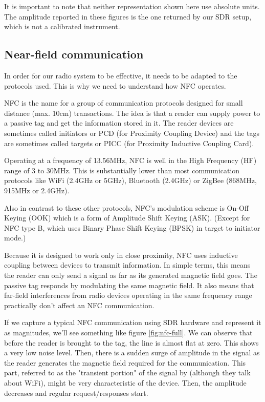 It is important to note that neither representation shown here use absolute units. The amplitude reported in these figures is the one returned by our SDR setup, which is not a calibrated instrument.

\subsection{Near-field communication} \label{nfc}

In order for our radio system to be effective, it needs to be adapted to the protocols used. This is why we need to understand how NFC operates.

NFC is the name for a group of communication protocols designed for small distance (max. 10cm) transactions. The idea is that a reader can supply power to a passive tag and get the information stored in it. The reader devices are sometimes called initiators or PCD (for Proximity Coupling Device) and the tags are sometimes called targets or PICC (for Proximity Inductive Coupling Card).

Operating at a frequency of 13.56MHz, NFC is well in the High Frequency (HF) range of 3 to 30MHz. This is substantially lower than most communication protocols like WiFi (2.4GHz or 5GHz), Bluetooth (2.4GHz) or ZigBee (868MHz, 915MHz or 2.4GHz).

Also in contrast to these other protocols, NFC's modulation scheme is On-Off Keying (OOK) which is a form of Amplitude Shift Keying (ASK). (Except for NFC type B, which uses Binary Phase Shift Keying (BPSK) in target to initiator mode.)

Because it is designed to work only in close proximity, NFC uses inductive coupling between devices to transmit information. In simple terms, this means the reader can only send a signal as far as its generated magnetic field goes. The passive tag responds by modulating the same magnetic field. It also means that far-field interferences from radio devices operating in the same frequency range practically don't affect an NFC communication. \cite{wiki_near-field_2020}

If we capture a typical NFC communication using SDR hardware and represent it as magnitudes, we'll see something like figure \ref{fig:nfc-full}. We can observe that before the reader is brought to the tag, the line is almost flat at zero. This shows a very low noise level. Then, there is a sudden surge of amplitude in the signal as the reader generates the magnetic field required for the communication. This part, referred to as the "transient portion" of the signal by \textcite{xu_device_2015} (although they talk about WiFi), might be very characteristic of the device. Then, the amplitude decreases and regular request/responses start.

